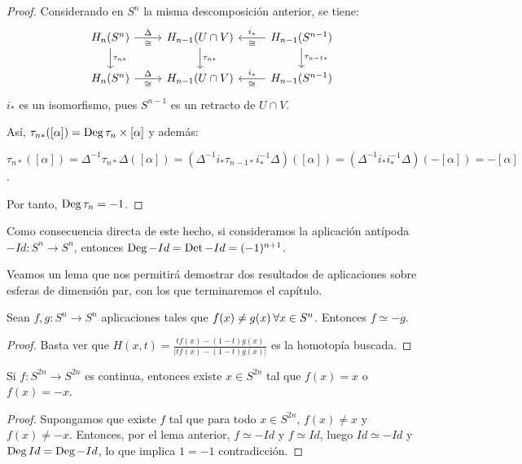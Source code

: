 \begin{proof}
  Considerando en $S^n$ la misma descomposición anterior, se tiene:
  \[ \begin{tikzcd}
    H_n(S^n) \arrow{r}{\Delta}[swap]{\cong} \arrow{d}{\tau_{n*}} & H_{n-1}(U \cap V) \arrow{d}{\tau_{n*}} & \arrow{l}{\cong}[swap]{i_*} H_{n-1}(S^{n-1}) \arrow{d}{\tau_{n-1*}} \\
    H_n(S^n) \arrow{r}{\Delta}[swap]{\cong} & H_{n-1}(U \cap V) & \arrow{l}{\cong}[swap]{i_*} H_{n-1}(S^{n-1})
  \end{tikzcd} \]
  $i_*$ es un isomorfismo, pues $S^{n-1}$ es un retracto de $U \cap V$.

  Así, $\tau_{n*}([\alpha]) = \operatorname{Deg} \tau_n \times [\alpha]$ y además:

  $\tau_{n*}([\alpha]) = \Delta^{-1} \tau_{n*} \Delta([\alpha]) = (\Delta^{-1} i_* \tau_{n-1*} i_*^{-1} \Delta)([\alpha])
  = (\Delta^{-1} i_* i_*^{-1} \Delta)(-[\alpha]) = -[\alpha]$.

  Por tanto, $\operatorname{Deg} \tau_n = -1$.
\end{proof}

Como consecuencia directa de este hecho, si consideramos la aplicación antípoda $-Id \colon S^n \to S^n$, entonces
$\operatorname{Deg} -Id = \operatorname{Det} -Id = (-1)^{n+1}$.

Veamos un lema que nos permitirá demostrar dos resultados de aplicaciones sobre esferas de dimensión par,
con los que terminaremos el capítulo.

\begin{lemma}
  Sean $f, g \colon S^n \to S^n$ aplicaciones tales que $f(x) \neq g(x) \hspace{0.2em} \forall x \in S^n$.
  Entonces $f \simeq -g$.
\end{lemma}

\begin{proof}
  Basta ver que $H(x, t) = \frac{t f(x) - (1-t)g(x)}{|t f(x) - (1-t)g(x)|}$ es la homotopía buscada.
\end{proof}

\begin{corollary}
  Si $f \colon S^{2n} \to S^{2n}$ es continua, entonces existe $x \in S^{2n}$ tal que $f(x) = x$ o $f(x) = -x$.
\end{corollary}

\begin{proof}
  Supongamos que existe $f$ tal que para todo $x \in S^{2n}$, $f(x) \neq x$ y $f(x) \neq -x$. Entonces, por
  el lema anterior, $f \simeq -Id$ y $f \simeq Id$, luego $Id \simeq -Id$ y $\operatorname{Deg} Id = \operatorname{Deg} -Id$, lo que implica
  $1 = -1$ contradicción.
\end{proof}

